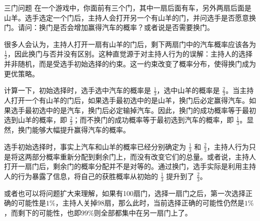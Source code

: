 \begin{example}{三门问题}
在一个游戏中，你面前有三个门，其中一扇后面有车，另外两扇后面是山羊。选手选定一个门后，主持人会打开另一个有山羊的门，并问选手是否愿意换门。请问：换门是否会增加赢得汽车的概率？或者说是否需要换门。
\end{example}

很多人会认为，主持人打开一扇有山羊的门后，剩下两扇门中的汽车概率应该各为 $\displaystyle\frac{1}{2}$，因此换门与否并没有区别。这种直觉源于对主持人行为的误解：主持人的选择并非随机，而是受选手初始选择的约束。这一约束改变了概率分布，使得换门成为更优策略。

计算一下，初始选择时，选手选中汽车的概率是 $\displaystyle\frac{1}{3}$，选中山羊的概率是 $\displaystyle\frac{2}{3}$。当主持人打开一个有山羊的门后，如果选手最初选中的是山羊，换门后必定赢得汽车。如果选手最初选中的是汽车，换门后必定输掉汽车。因此，换门的成功概率等于最初选到山羊的概率，即 $\displaystyle\frac{2}{3}$；而不换门的成功概率等于最初选到汽车的概率，即 $\displaystyle\frac{1}{3}$。显然，换门能够大幅提升赢得汽车的概率。

选手初始选择时，事实上汽车和山羊的概率已经分别确定为 $\displaystyle\frac{1}{3}$ 和 $\displaystyle\frac{2}{3}$，主持人行为只是将这两部分概率重新分配到剩余门上，而没有改变它们的总量。或者说，主持人打开一扇门后，剩余门的概率分配并不是对等的。通过换门，选手实际是利用主持人的行为暴露了信息，将自己的获胜概率从初始的 $\displaystyle\frac{1}{3}$ 提升到了 $\displaystyle\frac{2}{3}$。

或者也可以将问题扩大来理解，如果有100扇门，选择一扇门之后，第一次选择正确的可能性是$1\%$，主持人关掉98扇，那么此时，当前选择正确的可能性仍然是$1\%$，而剩下的可能性，也即$99\%$则全部都集中在另一扇门上了。